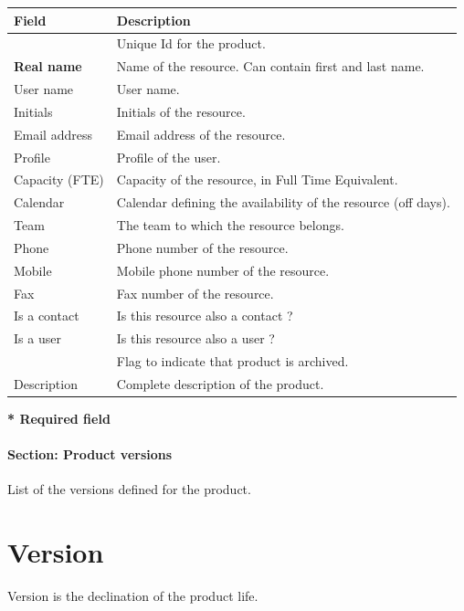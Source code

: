 \documentclass[letterpaper,10pt,english]{sphinxmanual}
\begin{document}
\begin{tabulary}{\linewidth}{|l|l|}
\hline
\textsf{\relax 
Field
} & \textsf{\relax 
Description
}\\
\hline
{\hyperref[Glossary:term-id]{\emph{}}}
 & 
Unique Id for the product.
\\
\hline
\textbf{Real name}
 & 
Name of the resource. Can contain first and last name.
\\
\hline
User name
 & 
User name.
\\
\hline
Initials
 & 
Initials of the resource.
\\
\hline
Email address
 & 
Email address of the resource.
\\
\hline
Profile
 & 
Profile of the user.
\\
\hline
Capacity (FTE)
 & 
Capacity of the resource, in Full Time Equivalent.
\\
\hline
Calendar
 & 
Calendar defining the availability of the resource (off days).
\\
\hline
Team
 & 
The team to which the resource belongs.
\\
\hline
Phone
 & 
Phone number of the resource.
\\
\hline
Mobile
 & 
Mobile phone number of the resource.
\\
\hline
Fax
 & 
Fax number of the resource.
\\
\hline
Is a contact
 & 
Is this resource also a contact ?
\\
\hline
Is a user
 & 
Is this resource also a user ?
\\
\hline
{\hyperref[Glossary:term-closed]{\emph{}}}
 & 
Flag to indicate that product is archived.
\\
\hline
Description
 & 
Complete description of the product.
\\
\hline\end{tabulary}


\textbf{* Required field}
\paragraph{Section: Product versions}

List of the versions defined for the product.
\newpage
{}

\section{Version}
\label{ProductVersion:version}\label{ProductVersion:index-1}
Version is the declination of the product life.
\end{document}
